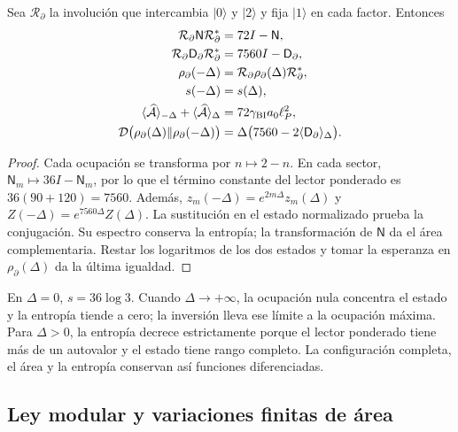 \begin{theorem}
\label{vii:vii:thm:inversion-sectorial}
Sea \(\mathcal R_\partial\) la involución que intercambia
\(|0\rangle\) y \(|2\rangle\) y fija \(|1\rangle\) en cada
factor. Entonces
\begin{align}
 \mathcal R_\partial\mathsf N\mathcal R_\partial^*&=72I-\mathsf N,\\
 \mathcal R_\partial\mathsf D_\partial\mathcal R_\partial^*
 &=7560I-\mathsf D_\partial,\\
 \rho_\partial(-\Delta)&=\mathcal R_\partial\rho_\partial(\Delta)
                          \mathcal R_\partial^*,\\
 s(-\Delta)&=s(\Delta),\\
 \langle\widehat{\mathcal A}\rangle_{-\Delta}
 +\langle\widehat{\mathcal A}\rangle_\Delta
 &=72\gamma_{\rm BI}a_0\ell_P^2,\\
 \mathcal D\bigl(\rho_\partial(\Delta)\Vert\rho_\partial(-\Delta)\bigr)
 &=\Delta\bigl(7560-2\langle\mathsf D_\partial\rangle_\Delta\bigr).
 \label{vii:vii:eq:inversion-sectorial}
\end{align}
\end{theorem}
\begin{proof}
Cada ocupación se transforma por \(n\mapsto2-n\). En cada sector,
\(\mathsf N_m\mapsto36I-\mathsf N_m\), por lo que el término
constante del lector ponderado es \(36(90+120)=7560\).
Además, \(z_m(-\Delta)=e^{2m\Delta}z_m(\Delta)\) y
\(Z(-\Delta)=e^{7560\Delta}Z(\Delta)\). La sustitución en el
estado normalizado prueba la conjugación. Su espectro conserva la entropía;
la transformación de \(\mathsf N\) da el área complementaria. Restar
los logaritmos de los dos estados y tomar la esperanza en
\(\rho_\partial(\Delta)\) da la última igualdad.
\end{proof}

En \(\Delta=0\), \(s=36\log3\). Cuando \(\Delta\to+\infty\),
la ocupación nula concentra el estado y la entropía tiende a cero;
la inversión lleva ese límite a la ocupación máxima. Para \(\Delta>0\),
la entropía decrece estrictamente porque el lector ponderado tiene más
de un autovalor y el estado tiene rango completo. La configuración
completa, el área y la entropía conservan así funciones diferenciadas.

\subsection{Ley modular y variaciones finitas de área}
\label{vii:vii:subsec:ley-modular-finita}

